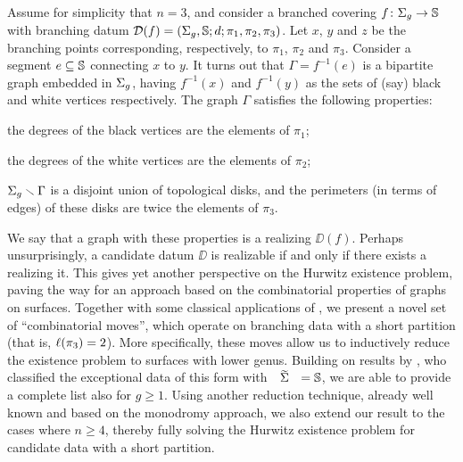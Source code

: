 \section*{\texorpdfstring{\Dessins{}}{Dessins d'enfant}}

Assume for simplicity that $n=3$, and consider a branched covering $\map{f}{\surf{g}}{\sphere{}}$ with branching datum $\mathcal{D}(f)=(\Sigma_{g},\mathbb{S}{};d;\pi_1,\pi_2,\pi_3)$. Let $x$, $y$ and $z$ be the branching points corresponding, respectively, to $\pi_1$, $\pi_2$ and $\pi_3$. Consider a segment $e\subseteq\mathbb{S}{}$ connecting $x$ to $y$. It turns out that $\Gamma=f^{-1}(e)$ is a bipartite graph embedded in $\Sigma_{g}$, having $f^{-1}(x)$ and $f^{-1}(y)$ as the sets of (say) black and white vertices respectively. The graph $\Gamma$ satisfies the following properties:
\begin{enumroman}
\item the degrees of the black vertices are the elements of $\pi_1$;
\item the degrees of the white vertices are the elements of $\pi_2$;
\item $\Sigma_{g}\smallsetminus\Gamma$ is a disjoint union of topological disks, and the perimeters (in terms of edges) of these disks are twice the elements of $\pi_3$.
\end{enumroman}

We say that a graph with these properties is a \emph{\dessin{}} realizing $\DD(f)$.
Perhaps unsurprisingly, a candidate datum $\DD$ is realizable if and only if there exists a \dessin{} realizing it. This gives yet another perspective on the Hurwitz existence problem, paving the way for an approach based on the combinatorial properties of graphs on surfaces. Together with some classical applications of \dessins{}, we present a novel set of ``combinatorial moves'', which operate on branching data with a short partition (that is, $\ell(\pi_3)=2$). More specifically, these moves allow us to inductively reduce the existence problem to surfaces with lower genus. Building on results by \citeauthor{pakovich}, who classified the exceptional data of this form with $\tSigma=\sphere{}$, we are able to provide a complete list also for $g\ge 1$. Using another reduction technique, already well known and based on the monodromy approach, we also extend our result to the cases where $n\ge 4$, thereby fully solving the Hurwitz existence problem for candidate data with a short partition.



%